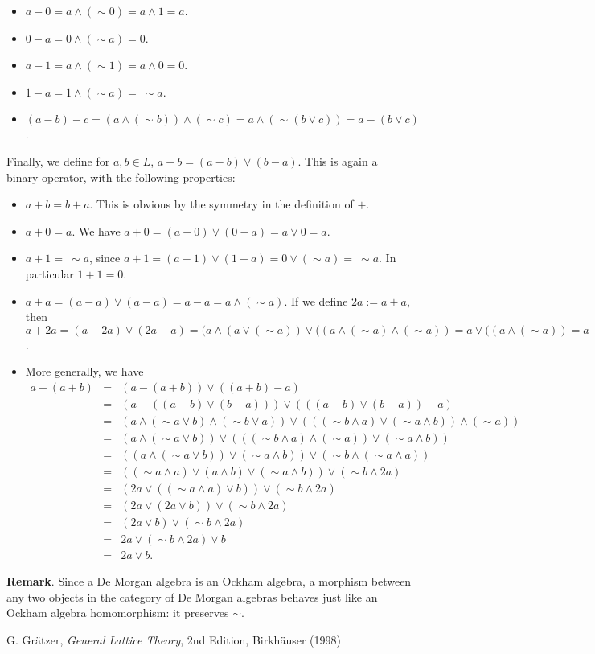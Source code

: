 \documentclass[12pt]{article}
\begin{document}
\begin{itemize}
\item $a-0 = a\wedge (\sim 0)=a\wedge 1 =a$.
\item $0-a = 0\wedge (\sim a)=0$.
\item $a-1 = a\wedge (\sim 1)=a\wedge 0=0$.
\item $1-a = 1\wedge (\sim a)=\ \sim a$.
\item $(a-b)-c=(a\wedge (\sim b))\wedge (\sim c)=a\wedge (\sim (b\vee c))=a-(b\vee c)$.
\end{itemize}

Finally, we define for $a,b\in L$, $a+b=(a-b)\vee (b-a)$.  This is again a binary operator, with the following properties:

\begin{itemize}
\item $a+b=b+a$.  This is obvious by the symmetry in the definition of $+$.
\item $a+0=a$.  We have $a+0=(a-0)\vee (0-a)=a\vee 0=a$.
\item $a+1=\ \sim a$, since $a+1=(a-1)\vee (1-a)=0\vee (\sim a)=\ \sim a$.  In particular $1+1=0$.
\item $a+a=(a-a)\vee(a-a)=a-a=a\wedge (\sim a)$.  If we define $2a:=a+a$, then $a+2a=(a-2a)\vee (2a-a)=(a\wedge (a\vee (\sim a))\vee ((a\wedge (\sim a)\wedge (\sim a))=a\vee ((a\wedge (\sim a))=a$.
\item More generally, we have 
\begin{eqnarray*}
a+(a+b) &=& (a-(a+b))\vee ((a+b)-a) \\
&=&(a-((a-b)\vee(b-a)))\vee (((a-b)\vee(b-a))-a) \\ 
&=&(a\wedge (\sim a\vee b)\wedge (\sim b\vee a))\vee (((\sim b \wedge a)\vee (\sim a\wedge b))\wedge (\sim a)) \\
&=& (a\wedge (\sim a\vee b))\vee (((\sim b\wedge a)\wedge (\sim a))\vee (\sim a\wedge b)) \\
&=& ((a\wedge (\sim a\vee b))\vee (\sim a\wedge b)) \vee (\sim b\wedge (\sim a\wedge a)) \\ 
&=& ((\sim a\wedge a) \vee (a\wedge b)\vee (\sim a \wedge b))\vee (\sim b\wedge 2a) \\
&=& (2a \vee ((\sim a \wedge a)\vee b))\vee (\sim b\wedge 2a) \\
&=& (2a \vee (2a \vee b))\vee (\sim b\wedge 2a) \\
&=& (2a \vee b)\vee (\sim b\wedge 2a) \\
&=& 2a \vee (\sim b \wedge 2a) \vee b \\ 
&=& 2a \vee b.
\end{eqnarray*}
\end{itemize}

\textbf{Remark}.  Since a De Morgan algebra is an Ockham algebra, a morphism between any two objects in the category of De Morgan algebras behaves just like an Ockham algebra homomorphism: it preserves $\sim$.

\begin{thebibliography}{6}
 G. Gr\"atzer, {\it General Lattice Theory}, 2nd Edition, Birkh\"auser (1998)
\end{thebibliography}
\end{document}
